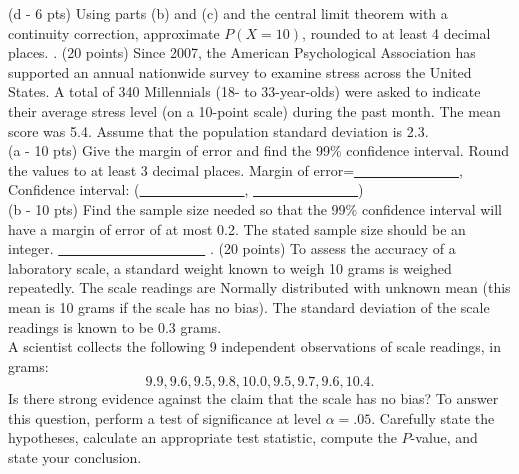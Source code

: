 \documentclass[12pt]{article}
\def\nn{\noindent}
\begin{document}
\nn (d - 6 pts) Using parts (b) and (c) and the central limit theorem with a continuity correction, approximate $P(X=10)$, rounded to at least 4 decimal places.
\newpage
\nn 4. (20 points) Since 2007, the American Psychological Association has supported an annual nationwide survey to examine stress across the United States. A total of 340 Millennials (18- to 33-year-olds) were asked to indicate their average stress level (on a 10-point scale) during the past month. The mean score was 5.4.  Assume that the population standard deviation is 2.3. \\
\nn (a - 10 pts) Give the margin of error and find the 99\% confidence interval.  Round the values to at least 3 decimal places. {Margin of error=\underline{\ \ \ \ \ \ \ \ \ \ \ \ \ \ \ }, Confidence interval: (\underline{\ \ \ \ \ \ \ \ \ \ \ \ \ \ \ }, \underline{\ \ \ \ \ \ \ \ \ \ \ \ \ \ \ })}  \\
\nn (b - 10 pts) Find the sample size needed so that the 99\% confidence interval will have a margin of error of at most 0.2.   The stated sample size should be an integer. {\underline{\ \ \ \ \ \ \ \ \ \ \ \ \ \ \ \ \ \ \ \ \ }}
\newpage
\nn 5. (20 points) To assess the accuracy of a laboratory scale, a standard weight known to weigh 10 grams is weighed repeatedly.  The scale readings are Normally distributed with unknown mean (this mean is 10 grams if the scale has no bias).  The standard deviation of the scale readings is known to be 0.3 grams. \\ 
A scientist collects the following 9 independent observations of scale readings, in grams:
\[
9.9, 9.6, 9.5, 9.8, 10.0, 9.5, 9.7, 9.6, 10.4.
\]
Is there strong evidence against the claim that the scale has no bias?  To answer this question, perform a test of significance at level $\alpha=.05$.  Carefully state the hypotheses, calculate an appropriate test statistic, compute the $P$-value, and state your conclusion.
\end{document}
